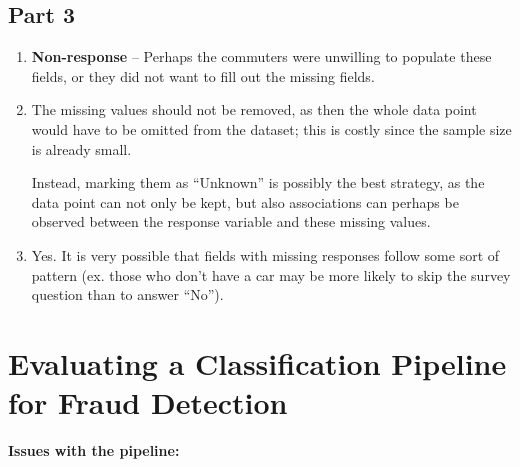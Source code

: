 \documentclass{article}
\begin{document}
\subsection{Part 3}

\begin{enumerate}
    \item \textbf{Non-response} -- Perhaps the commuters were unwilling to populate these fields, or they did not want to fill out the missing fields.

    \item The missing values should not be removed, as then the whole data point would have to be omitted from the dataset; this is costly since the sample size is already small.

    Instead, marking them as ``Unknown'' is possibly the best strategy, as the data point can not only be kept, but also associations can perhaps be observed between the response variable and these missing values.

    \item Yes. It is very possible that fields with missing responses follow some sort of pattern (ex. those who don't have a car may be more likely to skip the survey question than to answer ``No'').
\end{enumerate}

\section{Evaluating a Classification Pipeline for Fraud Detection}

\textbf{Issues with the pipeline:}
\end{document}
